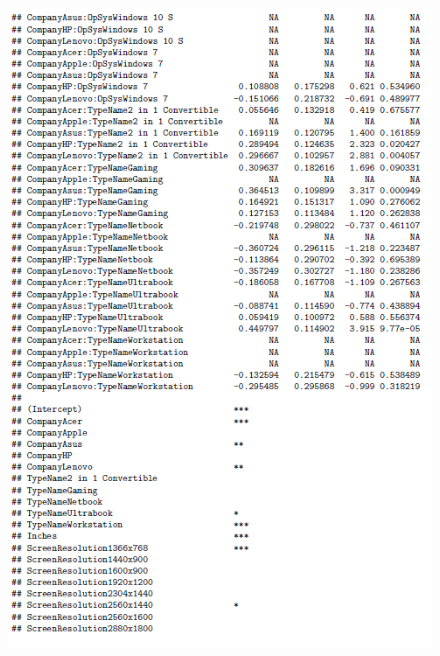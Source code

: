 \documentclass[12pt]{article}
\begin{document}
\begin{figure}[h!]
    \centering
    \includegraphics{Model_4_Sum(3_3).png}
    \label{fig:sum43}
\end{figure}
\end{document}
